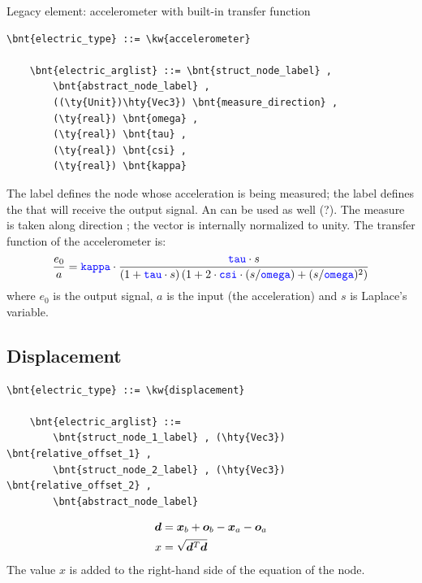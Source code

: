 \noindent
Legacy element: accelerometer with built-in transfer function
\begin{Verbatim}[commandchars=\\\{\}]
    \bnt{electric_type} ::= \kw{accelerometer}

    \bnt{electric_arglist} ::= \bnt{struct_node_label} ,
        \bnt{abstract_node_label} ,
        ((\ty{Unit})\hty{Vec3}) \bnt{measure_direction} ,
        (\ty{real}) \bnt{omega} ,
        (\ty{real}) \bnt{tau} ,
        (\ty{real}) \bnt{csi} ,
        (\ty{real}) \bnt{kappa}	
\end{Verbatim}
The label  defines the node whose acceleration 
is being measured; the label  defines the
 that will receive the output signal. 
An  can be used as well (?).
The measure is taken along direction ;
the vector is internally normalized to unity.
The transfer function of the accelerometer is:
\begin{displaymath}
    \frac{e_0}{a} = \textcolor{blue}{\texttt{kappa}} \cdot \frac{\textcolor{blue}{\texttt{tau}} \cdot s}{
        \left( 1 + \textcolor{blue}{\texttt{tau}} \cdot s \right)
        \left( 1 + 2 \cdot \textcolor{blue}{\texttt{csi}} \cdot (s/\textcolor{blue}{\texttt{omega}}) + (s/\textcolor{blue}{\texttt{omega}})^2 \right)
    }
\end{displaymath}
where $ e_0 $ is the output signal, $ a $ is the input (the acceleration)
and $ s $ is Laplace's variable.



\subsection{Displacement}
\begin{Verbatim}[commandchars=\\\{\}]
    \bnt{electric_type} ::= \kw{displacement}

    \bnt{electric_arglist} ::=
        \bnt{struct_node_1_label} , (\hty{Vec3}) \bnt{relative_offset_1} ,
        \bnt{struct_node_2_label} , (\hty{Vec3}) \bnt{relative_offset_2} ,
        \bnt{abstract_node_label}
\end{Verbatim}
\begin{subequations}
\begin{align}
	\boldsymbol{d} &= \boldsymbol{x}_b + \boldsymbol{o}_b - \boldsymbol{x}_a - \boldsymbol{o}_a \\
	x &= \sqrt{\boldsymbol{d}^T \boldsymbol{d}}
\end{align}
\end{subequations}
The value $x$ is added to the right-hand side of the equation
of the  node.

